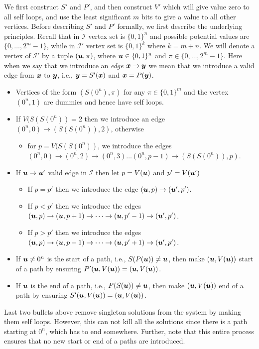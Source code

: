 \documentclass[a4paper,UKenglish]{lipics2}
\theoremstyle{definition}
\newcommand{\ra}{\rightarrow}
\newcommand{\CI}{\mbox{${\mathcal I}$}}
\newcommand{\yy}{\mbox{\boldmath $y$}}
\newcommand{\uu}{\mbox{\boldmath $u$}}
\newcommand{\xx}{\mbox{\boldmath $x$}}
\begin{document}
We first construct $S'$ and $P'$, and then construct $V'$ which will give
value zero to all self loops, and use the least significant $m$ bits to give a
value to all other vertices.
Before describing $S'$ and $P'$ formally, we first describe the underlying
principles. Recall that in $\CI$ vertex set is $\{0,1\}^n$ and possible potential values are $\{0,\dots,2^m-1\}$, while in $\CI'$ vertex set is $\{0,1\}^k$ where $k=m+n$. 
We will denote a vertex of $\CI'$ by a tuple $(\uu,\pi)$, where $\uu \in
\{0,1\}^n$ and $\pi\in \{0,\dots,2^m-1\}$. 
Here when we say that we introduce an {\em edge $\xx\rightarrow \yy$} we mean
that we introduce a valid edge from $\xx$ to $\yy$, i.e., $\yy=S'(\xx)$ and $\xx=P(\yy)$. 
\begin{itemize}
\item Vertices of the form $(S(0^n),\pi)$ for any $\pi \in \{0,1\}^m$ and the vertex $(0^n,1)$ are
dummies and hence have self loops.
\item If $V(S(S(0^n))=2$ then we introduce an edge $(0^n,0)\rightarrow(S(S(0^n)),2)$, otherwise 
\begin{itemize}
\item for $p=V(S(S(0^n))$, we introduce the edges $(0^n,0)\ra (0^n,2)\ra (0^n, 3)\dots (0^n,p-1)\ra (S(S(0^n)),p)$.
\end{itemize}
\item If $\uu \ra \uu'$ valid edge in $\CI$ then let $p=V(\uu)$ and $p'=V(\uu')$
\begin{itemize}
\item If $p=p'$ then we introduce the edge $(\uu,p)\ra (\uu',p')$. %
\item If $p<p'$ then we introduce the edges $(\uu,p)\ra (\uu,p+1)\ra \dots\ra (\uu,p'-1)\ra (\uu',p')$.
\item If $p>p'$ then we introduce the edges $(\uu,p)\ra (\uu,p-1)\ra \dots\ra (\uu,p'+1)\ra (\uu',p')$.
\end{itemize}
\item If $\uu\neq 0^n$ is the start of a path, i.e., $S(P(\uu))\neq \uu$, then
make $(\uu,V(\uu))$ start of a path by ensuring $P'(\uu,V(\uu))=(\uu,V(\uu))$.
\item If $\uu$ is the end of a path, i.e., $P(S(\uu))\neq \uu$, then make
$(\uu,V(\uu))$ end of a path by ensuring $S'(\uu,V(\uu))=(\uu,V(\uu))$.
\end{itemize}

Last two bullets above remove singleton solutions from the system by making them
self loops. However, this can not kill all the solutions since there is a path
starting at $0^n$, which has to end somewhere. Further, note that this entire process ensures that no new start or end of a paths are introduced. 
\medskip
\medskip
\end{document}
